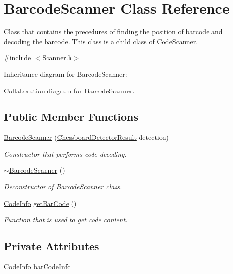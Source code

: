 \hypertarget{class_barcode_scanner}{}\section{Barcode\+Scanner Class Reference}
\label{class_barcode_scanner}


Class that contains the precedures of finding the position of barcode and decoding the barcode. This class is a child class of \hyperlink{class_code_scanner}{Code\+Scanner}.  




{\ttfamily \#include $<$Scanner.\+h$>$}



Inheritance diagram for Barcode\+Scanner\+:


Collaboration diagram for Barcode\+Scanner\+:
\subsection*{Public Member Functions}
\begin{DoxyCompactItemize}
\item 
\hyperlink{class_barcode_scanner_a75a2c1664c6fae1af960db85e4a118c1}{Barcode\+Scanner} (\hyperlink{struct_chessboard_detector_result}{Chessboard\+Detector\+Result} detection)
\begin{DoxyCompactList}\small\item\em Constructor that performs code decoding. \end{DoxyCompactList}\item 
\hyperlink{class_barcode_scanner_a8a9f32500c2e83547fd5cdce8450634a}{$\sim$\+Barcode\+Scanner} ()
\begin{DoxyCompactList}\small\item\em Deconstructor of \hyperlink{class_barcode_scanner}{Barcode\+Scanner} class. \end{DoxyCompactList}\item 
\hyperlink{struct_code_info}{Code\+Info} \hyperlink{class_barcode_scanner_a33b8ce809789f70f0c5b63447175d218}{get\+Bar\+Code} ()
\begin{DoxyCompactList}\small\item\em Function that is used to get code content. \end{DoxyCompactList}\end{DoxyCompactItemize}
\subsection*{Private Attributes}
\begin{DoxyCompactItemize}
\item 
\hyperlink{struct_code_info}{Code\+Info} \hyperlink{class_barcode_scanner_a843ee092e719a72ed88002e89d9e9992}{bar\+Code\+Info}
\end{DoxyCompactItemize}
